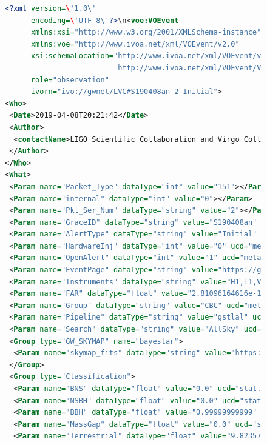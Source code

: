 \begin{colsection}
\begin{colsection}
\begin{figure}[p]
\begin{lstlisting}[language=xml,
       tabsize=2,
       breaklines=true,
       keywordstyle={},
       stringstyle=\color{red},
       showstringspaces=false,
       basicstyle=\scriptsize,
       emph={voe,Who,What,WhereWhen,How,Citations},
       emphstyle={\color{magenta}}
       ]
<?xml version=\'1.0\'
      encoding=\'UTF-8\'?>\n<voe:VOEvent
      xmlns:xsi="http://www.w3.org/2001/XMLSchema-instance"
      xmlns:voe="http://www.ivoa.net/xml/VOEvent/v2.0"
      xsi:schemaLocation="http://www.ivoa.net/xml/VOEvent/v2.0
                          http://www.ivoa.net/xml/VOEvent/VOEvent-v2.0.xsd"
      role="observation"
      ivorn="ivo://gwnet/LVC#S190408an-2-Initial">
<Who>
 <Date>2019-04-08T20:21:42</Date>
 <Author>
  <contactName>LIGO Scientific Collaboration and Virgo Collaboration</contactName>
 </Author>
</Who>
<What>
 <Param name="Packet_Type" dataType="int" value="151"></Param>
 <Param name="internal" dataType="int" value="0"></Param>
 <Param name="Pkt_Ser_Num" dataType="string" value="2"></Param>
 <Param name="GraceID" dataType="string" value="S190408an" ucd="meta.id"></Param>
 <Param name="AlertType" dataType="string" value="Initial" ucd="meta.version"></Param>
 <Param name="HardwareInj" dataType="int" value="0" ucd="meta.number"></Param>
 <Param name="OpenAlert" dataType="int" value="1" ucd="meta.number"></Param>
 <Param name="EventPage" dataType="string" value="https://gracedb.ligo.org/superevents/S190408an/view/" ucd="meta.ref.url"></Param>
 <Param name="Instruments" dataType="string" value="H1,L1,V1" ucd="meta.code"> </Param>
 <Param name="FAR" dataType="float" value="2.81096164616e-18" ucd="arith.rate;stat.falsealarm" unit="Hz"></Param>
 <Param name="Group" dataType="string" value="CBC" ucd="meta.code"></Param>
 <Param name="Pipeline" dataType="string" value="gstlal" ucd="meta.code"></Param>
 <Param name="Search" dataType="string" value="AllSky" ucd="meta.code"></Param>
 <Group type="GW_SKYMAP" name="bayestar">
  <Param name="skymap_fits" dataType="string" value="https://gracedb.ligo.org/api/superevents/S190408an/files/bayestar.fits.gz" ucd="meta.ref.url"></Param>
 </Group>
 <Group type="Classification">
  <Param name="BNS" dataType="float" value="0.0" ucd="stat.probability"></Param>
  <Param name="NSBH" dataType="float" value="0.0" ucd="stat.probability"></Param>
  <Param name="BBH" dataType="float" value="0.99999999999" ucd="stat.probability"></Param>
  <Param name="MassGap" dataType="float" value="0.0" ucd="stat.probability"></Param>
  <Param name="Terrestrial" dataType="float" value="9.82357724531e-12" ucd="stat.probability"></Param>

\end{lstlisting}
\end{figure}
\end{colsection}
\end{colsection}
